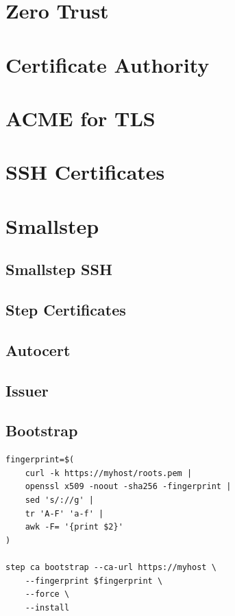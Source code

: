 \section{Zero Trust}

\section{Certificate Authority}

\section{ACME for TLS}

\section{SSH Certificates}

\section{Smallstep}

\subsection{Smallstep SSH}

\subsection{Step Certificates}

\subsection{Autocert}

\subsection{Issuer}

\subsection{Bootstrap}

\begin{verbatim}
fingerprint=$(
    curl -k https://myhost/roots.pem | 
    openssl x509 -noout -sha256 -fingerprint | 
    sed 's/://g' | 
    tr 'A-F' 'a-f' | 
    awk -F= '{print $2}'
)

step ca bootstrap --ca-url https://myhost \
    --fingerprint $fingerprint \
    --force \
    --install
\end{verbatim}


